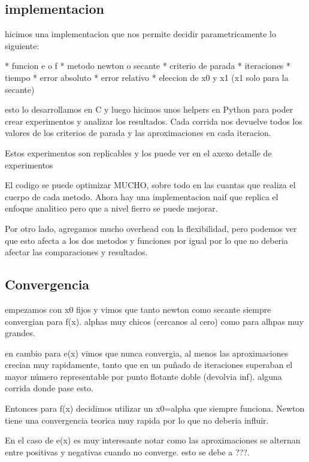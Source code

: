 \documentclass[10pt,a4paper]{article}
\begin{document}
\subsection{implementacion}

hicimos una implementacion que nos permite decidir parametricamente lo siguiente:

* funcion e o f
* metodo newton o secante
* criterio de parada
  * iteraciones
  * tiempo
  * error absoluto
  * error relativo
* eleccion de x0 y x1 (x1 solo para la secante)

esto lo desarrollamos en C y luego hicimos unos helpers en Python para poder
crear experimentos y analizar los resultados. Cada corrida nos devuelve todos
los valores de los criterios de parada y las aproximaciones en cada iteracion.

Estos experimentos son replicables y los puede ver en el axexo {detalle de experimentos}

El codigo se puede optimizar MUCHO, sobre todo en las cuantas que realiza el
cuerpo de cada metodo. Ahora hay una implementacion naif que replica el enfoque
analitico pero que a nivel fierro se puede mejorar.

Por otro lado, agregamos mucho overhead con la flexibilidad, pero podemos ver
que esto afecta a los dos metodos y funciones por igual por lo que no deberia
afectar las comparaciones y resultados.

\subsection{Convergencia}

empezamos con x0 fijos y vimos que tanto newton como secante siempre convergian
para f(x). %
alphas muy chicos (cercanos al cero) como para alhpas muy grandes.

en cambio para e(x) vimos que nunca convergia, al menos las aproximaciones
crecian muy rapidamente, tanto que en un puñado de iteraciones superaban el
mayor número representable por punto flotante doble (devolvia inf). %
alguna corrida donde pase esto.

Entonces para f(x) decidimos utilizar un x0=alpha que siempre funciona. Newton
tiene una convergencia teorica muy rapida por lo que no deberia influir.

En el caso de e(x) es muy interesante notar como las aproximaciones se alternan
entre positivas y negativas cuando no converge. esto se debe a ???.
\end{document}
